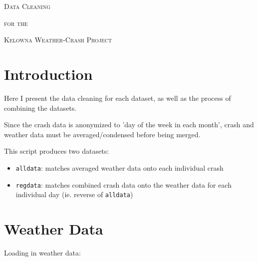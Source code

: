 \documentclass[11pt, a4paper]{article}
\begin{document}


\begin{center}
\Large{\textsc{Data Cleaning}}
\par
\normalsize{\textsc{for the}}
\par
\large{\textsc{Kelowna Weather-Crash Project}}
\end{center}


\vspace{0.917 pc} %

\tableofcontents


\pagebreak
\section{Introduction}



Here I present the data cleaning for each dataset, as well as the process of combining the datasets. 
\par
Since the crash data is anonymized to 'day of the week in each month', crash and weather data must be averaged/condensed before being merged.
\par
\vspace{1pc}
\par
This script produces two datasets:
\begin{itemize}
\item \texttt{alldata}: matches averaged weather data onto each individual crash 
\item \texttt{regdata}: matches combined crash data onto the weather data for each individual day (ie. reverse of \texttt{alldata})
\end{itemize}



\pagebreak
\section{Weather Data}
Loading in weather data:
\end{document}
